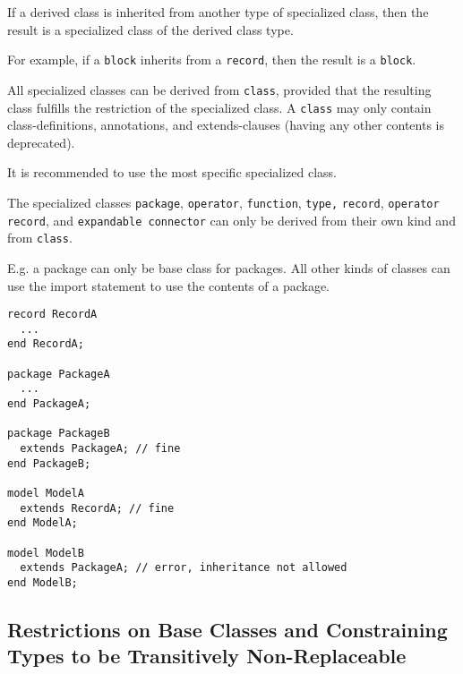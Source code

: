 If a derived class is inherited from another type of specialized class,
then the result is a specialized class of the derived class type.

\begin{nonnormative}
For example, if a \lstinline!block! inherits from a \lstinline!record!, then the result is a \lstinline!block!.
\end{nonnormative}

All specialized classes can be derived from \lstinline!class!, provided that the
resulting class fulfills the restriction of the specialized class.  A \lstinline!class! may
only contain class-definitions, annotations, and extends-clauses (having
any other contents is deprecated).

\begin{nonnormative}
It is recommended to use the most specific specialized class.
\end{nonnormative}

The specialized classes \lstinline!package!, \lstinline!operator!, \lstinline!function!,
\lstinline!type,! \lstinline!record!,
\lstinline!operator record!, and \lstinline!expandable connector! can only be derived from their
own kind and from \lstinline!class!.

\begin{nonnormative}
E.g. a package can only be base class for packages.  All other kinds of classes can use the import statement to use the contents of a package.
\end{nonnormative}

\begin{example}
\begin{lstlisting}[language=modelica]
record RecordA
  ...
end RecordA;

package PackageA
  ...
end PackageA;

package PackageB
  extends PackageA; // fine
end PackageB;

model ModelA
  extends RecordA; // fine
end ModelA;

model ModelB
  extends PackageA; // error, inheritance not allowed
end ModelB;
\end{lstlisting}
\end{example}

\subsection{Restrictions on Base Classes and Constraining Types to be Transitively Non-Replaceable}

